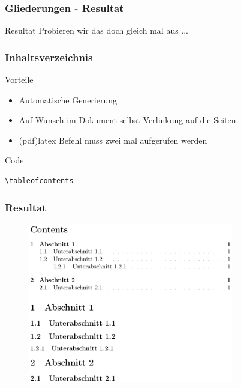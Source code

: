 \begin{frame}
  \frametitle{Gliederungen - Resultat}

  \begin{block}{Resultat}
    Probieren wir das doch gleich mal aus ...
  \end{block}
\end{frame}

\begin{frame}[fragile]
	\frametitle{Inhaltsverzeichnis}

  \begin{block}{Vorteile}
  	\begin{itemize}[<+->]
  		\item Automatische Generierung
  		\item Auf Wunsch im Dokument selbst Verlinkung auf die Seiten
  		\item (pdf)latex Befehl muss zwei mal aufgerufen werden
  	\end{itemize}
  \end{block}
  \pause
	\begin{block}{Code}
		\begin{verbatim}
\tableofcontents
    \end{verbatim}
	\end{block}
\end{frame}

\begin{frame}
	\frametitle{Resultat}

  \begin{figure}
    \centering
    \includegraphics[width=0.8\textwidth]{images/TableOfContents.eps}
  \end{figure}
\end{frame}


